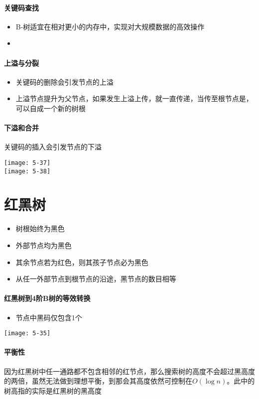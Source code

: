 \paragraph{关键码查找}
\begin{itemize}
\item B-树适宜在相对更小的内存中，实现对大规模数据的高效操作
\item 
\end{itemize}

\paragraph{上溢与分裂}
\begin{itemize}
\item 关键码的删除会引发节点的上溢
\item 上溢节点提升为父节点，如果发生上溢上传，就一直传递，当传至根节点是，可以自成一个新的树根
\end{itemize}

\paragraph{下溢和合并}
关键码的插入会引发节点的下溢

\texttt{[image: 5-37]}\\
\texttt{[image: 5-38]}


\section{红黑树}
\begin{itemize}
\item 树根始终为黑色
\item 外部节点均为黑色
\item 其余节点若为红色，则其孩子节点必为黑色
\item 从任一外部节点到根节点的沿途，黑节点的数目相等
\end{itemize}

\paragraph{红黑树到4阶B树的等效转换}
\begin{itemize}
\item 节点中黑码仅包含1个
\end{itemize}
\texttt{[image: 5-35]}

\paragraph{平衡性}
因为红黑树中任一通路都不包含相邻的红节点，那么搜索树的高度不会超过黑高度的两倍，虽然无法做到理想平衡，到那会其高度依然可控制在$O(\log n)$。此中的树高指的实际是红黑树的黑高度

